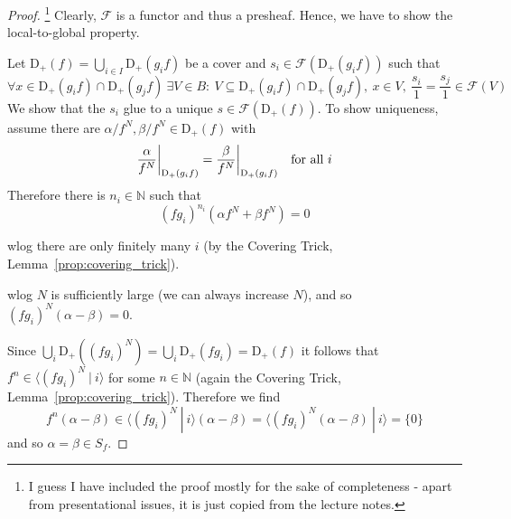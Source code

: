 \documentclass{scrartcl}
\newcommand{\N}{\mathbb{N}}
\newcommand{\D}[1]{\mathrm{D}_+(#1)}
\newcommand\restr[2]{{
    \left.\kern-\nulldelimiterspace
    #1
    \vphantom{\big|}
    \right|_{#2}
}}
\theoremstyle{definition}
\begin{document}
\begin{proof}\footnote{I guess I have included the proof mostly for the sake of completeness - apart from presentational issues, it is just copied from the lecture notes.}
    Clearly, $\mathcal{F}$ is a functor and thus a presheaf.
    Hence, we have to show the local-to-global property.

    Let $\D{f} = \bigcup_{i \in I} \D{g_if}$ be a cover and $s_i \in \mathcal{F}(\D{g_if})$ such that
    \begin{equation*}
        \forall x \in \D{g_if} \cap \D{g_jf} \ \exists V \in B: \ V \subseteq \D{g_if} \cap \D{g_jf}, \ x \in V, \ \frac {s_i} 1 = \frac {s_j} 1 \in \mathcal{F}(V)
    \end{equation*}
    We show that the $s_i$ glue to a unique $s \in \mathcal{F}(\D{f})$.
    To show uniqueness, assume there are $\alpha/f^N, \beta/f^N \in \D{f}$ with
    \begin{equation*}
        \restr{\frac {\alpha} {f^N}}{\D{g_if}} = \restr{\frac {\beta} {f^N}}{\D{g_if}} \quad \text{for all $i$}
    \end{equation*}
    Therefore there is $n_i \in \N$ such that
    \begin{equation*}
        (f g_i)^{n_i} (\alpha f^N + \beta f^N) = 0
    \end{equation*}

    wlog there are only finitely many $i$ (by the Covering Trick, Lemma~\ref{prop:covering_trick}).

    wlog $N$ is sufficiently large (we can always increase $N$), and so $(fg_i)^N(\alpha - \beta) = 0$.

    Since $\bigcup_i \D{(fg_i)^N} = \bigcup_i \D{fg_i} = \D{f}$ it follows that $f^n \in \langle (fg_i)^N \ | \ i \rangle$ for some $n \in \N$ (again the Covering Trick, Lemma~\ref{prop:covering_trick}).
    Therefore we find
    \begin{equation*}
        f^n(\alpha - \beta) \in \langle (f g_i)^N \ | \ i \rangle (\alpha - \beta) = \langle (f g_i)^N (\alpha - \beta) \ | \ i \rangle = \{ 0 \}
    \end{equation*}
    and so $\alpha = \beta \in S_f$.


\end{proof}
\end{document}

